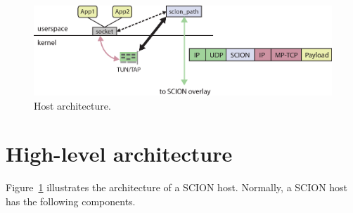 \begin{figure}[ht]
\centering
\begin{minipage}{0.85\textwidth}
\includegraphics[width=1\columnwidth]{./fig/host2.eps}
\end{minipage}
\caption{Host architecture.}\label{fig:host}
\end{figure}

\section{High-level architecture} 


Figure~\ref{fig:host} illustrates the architecture of a SCION host.
Normally, a SCION host has the following components.

